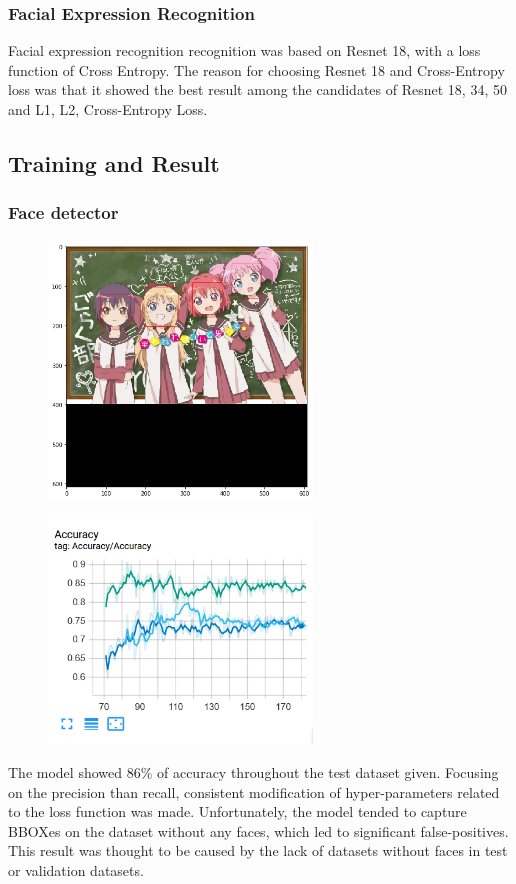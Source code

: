 \documentclass{article}
\begin{document}
\subsubsection{Facial Expression Recognition}
Facial expression recognition recognition was based on Resnet 18, with a loss
function of Cross Entropy. The reason for choosing Resnet 18 and Cross-Entropy
loss was that it showed the best result among the candidates of Resnet 18, 34,
50 and L1, L2, Cross-Entropy Loss.

\subsection{Training and Result}
\subsubsection{Face detector}
\begin{figure}[h]
  \centering
  \includegraphics[width=7cm]{image/yolo_example.png}
\end{figure}
\begin{figure}[h]
  \centering
  \includegraphics[width=7cm]{image/yolo_accuracy.png}
\end{figure}

The model showed 86\% of accuracy throughout the test dataset given. Focusing on
the precision than recall, consistent modification of hyper-parameters related
to the loss function was made. Unfortunately, the model tended to capture BBOXes
on the dataset without any faces, which led to significant false-positives. This
result was thought to be caused by the lack of datasets without faces in test or
validation datasets.
\end{document}
